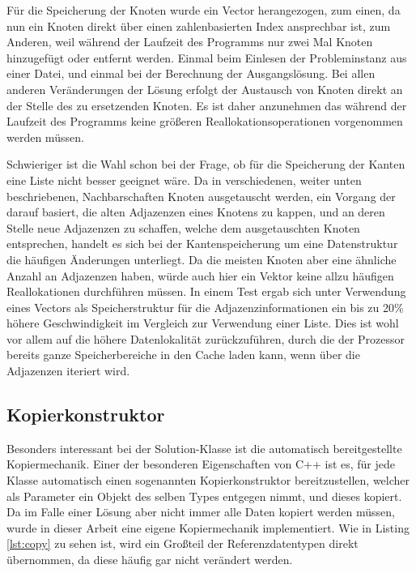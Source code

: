 Für die Speicherung der Knoten wurde ein Vector herangezogen, zum einen, da nun ein Knoten direkt über einen zahlenbasierten Index ansprechbar ist, zum Anderen, weil während der Laufzeit des Programms nur
zwei Mal Knoten hinzugefügt oder entfernt werden. Einmal beim Einlesen der Probleminstanz aus einer Datei, und einmal bei der Berechnung der Ausgangslösung. Bei allen anderen Veränderungen der Lösung erfolgt
der Austausch von Knoten direkt an der Stelle des zu ersetzenden Knoten. Es ist daher anzunehmen das während der Laufzeit des Programms keine größeren Reallokationsoperationen vorgenommen werden müssen.

Schwieriger ist die Wahl schon bei der Frage, ob für die Speicherung der Kanten eine Liste nicht besser geeignet wäre. Da in verschiedenen, weiter unten beschriebenen, Nachbarschaften Knoten ausgetauscht werden,
ein Vorgang der darauf basiert, die alten Adjazenzen eines Knotens zu kappen, und an deren Stelle neue Adjazenzen zu schaffen, welche dem ausgetauschten Knoten entsprechen, handelt es sich bei der Kantenspeicherung
um eine Datenstruktur die häufigen Änderungen unterliegt. Da die meisten Knoten aber eine ähnliche Anzahl an Adjazenzen haben, würde auch hier ein Vektor keine allzu häufigen Reallokationen durchführen müssen.
In einem Test ergab sich unter Verwendung eines Vectors als Speicherstruktur für die Adjazenzinformationen ein bis zu 20\% höhere Geschwindigkeit im Vergleich zur Verwendung einer Liste. Dies ist wohl vor allem
auf die höhere Datenlokalität zurückzuführen, durch die der Prozessor bereits ganze Speicherbereiche in den Cache laden kann, wenn über die Adjazenzen iteriert wird.

\subsection{Kopierkonstruktor}
\label{sec:copy}

Besonders interessant bei der Solution-Klasse ist die automatisch bereitgestellte Kopiermechanik. Einer der besonderen Eigenschaften von C++ ist es, für jede Klasse automatisch einen sogenannten Kopierkonstruktor
bereitzustellen, welcher als Parameter ein Objekt des selben Types entgegen nimmt, und dieses kopiert. Da im Falle einer Lösung aber nicht immer alle Daten kopiert werden müssen, wurde in dieser Arbeit eine
eigene Kopiermechanik implementiert. Wie in Listing \ref{lst:copy} zu sehen ist, wird ein Großteil der Referenzdatentypen direkt übernommen, da diese häufig gar nicht verändert werden. 

